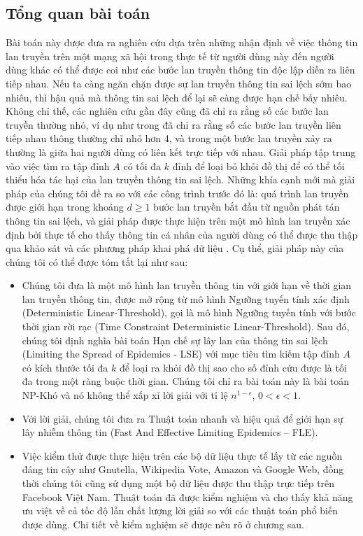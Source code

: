 	\subsection{Tổng quan bài toán}
	Bài toán này được đưa ra nghiên cứu dựa trên những nhận định về việc thông tin lan truyền trên một mạng xã hội trong thực tế từ người dùng này đến người dùng khác có thể được coi như các bước lan truyền thông tin độc lập diễn ra liên tiếp nhau. Nếu ta càng ngăn chặn được sự lan truyền thông tin sai lệch sớm bao nhiêu, thì hậu quả mà thông tin sai lệch để lại sẽ càng được hạn chế bấy nhiêu. Không chỉ thế, các nghiên cứu gần đây cũng đã chỉ ra rằng số các bước lan truyền thường nhỏ, ví dụ như trong \cite{cha23} đã chỉ ra rằng số các bước lan truyền liên tiếp nhau thông thường chỉ nhỏ hơn 4, và trong \cite{lesk16} một bước lan truyền xảy ra thường là giữa hai người dùng có liên kết trực tiếp với nhau.
	Giải pháp tập trung vào việc tìm ra tập đỉnh $A$ có tối đa $k$ đỉnh để loại bỏ khỏi đồ thị để có thể tối thiểu hóa tác hại của lan truyền thông tin sai lệch. Những khía cạnh mới mà giải pháp của chúng tôi đề ra so với các công trình trước đó là: quá trình lan truyền được giới hạn trong khoảng $d \geq 1$ bước lan truyền bắt đầu từ nguồn phát tán thông tin sai lệch, và giải pháp được thực hiện trên một mô hình lan truyền xác định bởi thực tế cho thấy thông tin cá nhân của người dùng có thể được thu thập qua khảo sát và các phương pháp khai phá dữ liệu \cite{zaixin}. Cụ thể, giải pháp này của chúng tôi có thể được tóm tắt lại như sau:
	\begin{itemize}
		\item Chúng tôi đưa là một mô hình lan truyền thông tin với giới hạn về thời gian lan truyền thông tin, được mở rộng từ mô hình Ngưỡng tuyến tính xác định (Deterministic Linear-Threshold), gọi là mô hình Ngưỡng tuyến tính với bước thời gian rời rạc (Time Constraint Deterministic Linear-Threshold). Sau đó, chúng tôi định nghĩa bài toán Hạn chế sự lây lan của thông tin sai lệch (Limiting the Spread of Epidemics - LSE) với mục tiêu tìm kiếm tập đỉnh $A$ có kích thước tối đa $k$ để loại ra khỏi đồ thị sao cho số đỉnh cứu được là tối đa trong một ràng buộc thời gian. Chúng tôi chỉ ra bài toán này là bài toán NP-Khó và nó không thể xấp xỉ lời giải với tỉ lệ $n^{1-\epsilon}$, $0 < \epsilon < 1$.
		\item Với lời giải, chúng tôi đưa ra Thuật toán nhanh và hiệu quả để giới hạn sự lây nhiễm thông tin (Fast And Effective Limiting Epidemics – FLE).
		\item Việc kiểm thử được thực hiện trên các bộ dữ liệu thực tế lấy từ các nguồn đáng tin cậy như Gnutella, Wikipedia Vote, Amazon và Google Web, đồng thời chúng tôi cũng sử dụng một bộ dữ liệu được thu thập trực tiếp trên Facebook Việt Nam. Thuật toán đã được kiểm nghiệm và cho thấy khả năng ưu việt về cả tốc độ lẫn chất lượng lời giải so với các thuật toán phổ biến được dùng. Chi tiết về kiểm nghiệm sẽ được nêu rõ ở chương sau.
	\end{itemize}  
